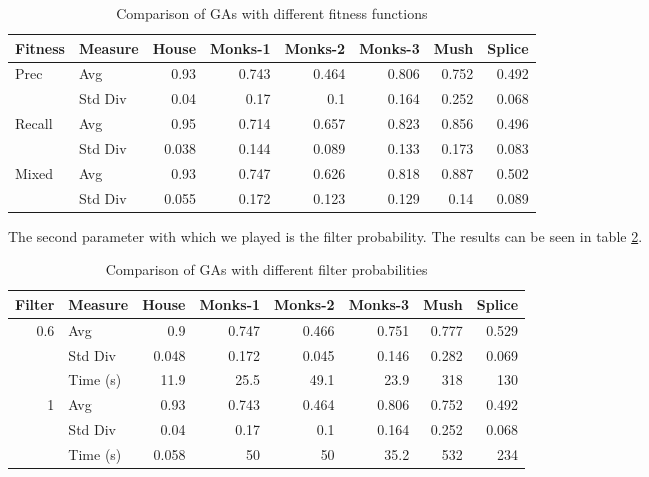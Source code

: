 \documentclass[12pt, letterpaper]{article}
\begin{document}
\begin{table}[htbp]
\caption{Comparison of GAs with different fitness functions}
\begin{center}
\begin{tabular}{|l|l|r|r|r|r|r|r|}
\hline
\textbf{Fitness} & \textbf{Measure} & \textbf{House} & \textbf{Monks-1} & \textbf{Monks-2} & \textbf{Monks-3} & \multicolumn{1}{l|}{\textbf{Mush}} & \multicolumn{1}{l|}{\textbf{Splice}} \\ \hline
Prec & Avg & 0.93 & 0.743 & 0.464 & 0.806 & 0.752 & 0.492 \\ \cline{2-7}
 & Std Div & 0.04 & 0.17 & 0.1 & 0.164 & 0.252 & 0.068 \\ \hline
 Recall & Avg & 0.95 & 0.714 & 0.657 & 0.823 & 0.856 & 0.496 \\ \cline{2-7}
 & Std Div & 0.038 & 0.144 & 0.089 & 0.133 & 0.173 & 0.083 \\ \hline
 Mixed & Avg & 0.93 & 0.747 & 0.626 & 0.818 & 0.887 & 0.502 \\ \cline{2-7}
 & Std Div & 0.055 & 0.172 & 0.123 & 0.129 & 0.14 & 0.089 \\ \hline
\end{tabular}
\end{center}
\label{tab:fitness}
\end{table}

The second parameter with which we played is the filter probability. The results can be seen in table \ref{tab:filter}.

\begin{table}[htbp]
\caption{Comparison of GAs with different filter probabilities}
\begin{tabular}{|l|l|r|r|r|r|r|r|}
\hline
\textbf{Filter} & \textbf{Measure} & \multicolumn{1}{l|}{\textbf{House}} & \multicolumn{1}{l|}{\textbf{Monks-1}} & \multicolumn{1}{l|}{\textbf{Monks-2}} & \multicolumn{1}{l|}{\textbf{Monks-3}} & \multicolumn{1}{l|}{\textbf{Mush}} & \multicolumn{1}{l|}{\textbf{Splice}} \\ \hline
\multicolumn{1}{|r|}{0.6} & Avg & 0.9 & 0.747 & 0.466 & 0.751 & 0.777 & 0.529 \\ \cline{2-8}
& Std Div & 0.048 & 0.172 & 0.045 & 0.146 & 0.282 & 0.069 \\ \cline{2-8}
 & Time (s) & 11.9 & 25.5 & 49.1 & 23.9 & 318 & 130 \\ \hline
 \multicolumn{1}{|r|}{1} & Avg & 0.93 & 0.743 & 0.464 & 0.806 & 0.752 & 0.492 \\ \cline{2-8}
 & Std Div & 0.04 & 0.17 & 0.1 & 0.164 & 0.252 & 0.068 \\ \cline{2-8}
 & Time (s) & 0.058 & 50 & 50 & 35.2 & 532 & 234 \\ \hline
\end{tabular}
\label{tab:filter}
\end{table}
\end{document}
